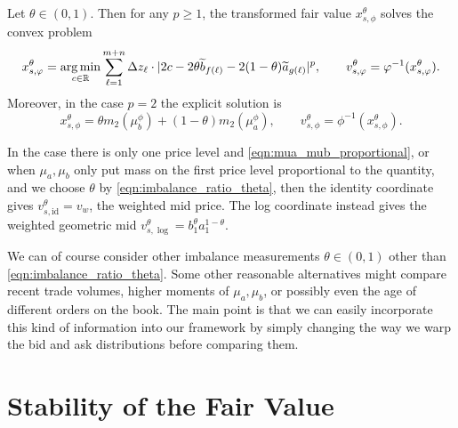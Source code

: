 \begin{theorem}
\label{thm:imbalanced_wasserstein_solution}
    Let $\theta \in (0,1)$. Then for any $p \geq 1$, the transformed fair value
    $x_{s,\phi}^\theta$ solves the convex problem
%
\begin{equation}
   x_{s,\varphi}^\theta = \operatorname*{arg\,min}_{c \in \mathbb R} \sum_{\ell = 1}^{m+n} \Delta z_\ell \cdot
   |2c - 2\theta \widetilde b_{f(\ell)} - 2(1-\theta)\widetilde a_{g(\ell)}|^p,
   \qquad v_{s,\varphi}^\theta=\varphi^{-1}(x_{s,\varphi}^\theta).
   \label{eqn:wp_imbalanced_symmetric_fair_value}
\end{equation}
%
\noindent Moreover, in the case $p = 2$ the explicit solution is
%
\begin{equation}
    x_{s,\phi}^\theta=\theta m_2(\mu_b^\phi)+(1-\theta)m_2(\mu_a^\phi),
    \qquad v_{s,\phi}^\theta=\phi^{-1}(x_{s,\phi}^\theta).
    \label{eqn:w2_imbalanced_symmetric_fair_value}
\end{equation}
\end{theorem}

%
\begin{remark}
    In the case there is only one price level and \eqref{eqn:mua_mub_proportional}, or
    when $\mu_a, \mu_b$ only put mass on the first price level proportional to the quantity,
    and we choose $\theta$ by \eqref{eqn:imbalance_ratio_theta}, then the identity coordinate gives
    $v_{s,\mathrm{id}}^\theta=v_w$, the weighted mid price. The log coordinate instead gives the weighted geometric mid
    $v_{s,\log}^\theta=b_1^\theta a_1^{1-\theta}$.
\end{remark}


\noindent We can of course consider other imbalance measurements
$\theta \in (0,1)$ other than \eqref{eqn:imbalance_ratio_theta}.
Some other reasonable alternatives might compare recent trade
volumes, higher moments of $\mu_a, \mu_b$, or possibly even
the age of different orders on the book. The main point is that
 we can easily incorporate this kind of information into our
 framework by simply changing the way we warp the bid and ask
 distributions before comparing them.

\section{Stability of the Fair Value}
\label{sec:stability_fv}

